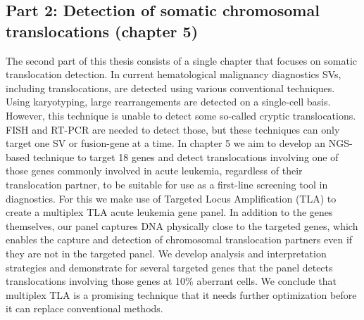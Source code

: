 \subsection{Part 2: Detection of somatic chromosomal translocations (chapter 5)}\label{Part2}
The second part of this thesis consists of a single chapter that focuses on somatic translocation detection. 
In current hematological malignancy diagnostics SVs, including translocations, are detected using various conventional techniques. 
Using karyotyping, large rearrangements are detected on a single-cell basis. 
However, this technique is unable to detect some so-called cryptic translocations. 
FISH and RT-PCR are needed to detect those, but these techniques can only target one SV or fusion-gene at a time. 
In chapter 5 we aim to develop an NGS-based technique to target 18 genes and detect translocations involving one of those genes commonly involved in acute leukemia, regardless of their translocation partner, to be suitable for use as a first-line screening tool in diagnostics. 
For this we make use of Targeted Locus Amplification (TLA) \cite{de_Vree_2014} to create a multiplex TLA acute leukemia gene panel. In addition to the genes themselves, our panel captures DNA physically close to the targeted genes, which enables the capture and detection of chromosomal translocation partners even if they are not in the targeted panel. 
We develop analysis and interpretation strategies and demonstrate for several targeted genes that the panel detects translocations involving those genes at 10\% aberrant cells. 
We conclude that multiplex TLA is a promising technique that it needs further optimization before it can replace conventional methods.

